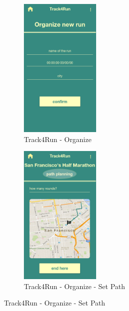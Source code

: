 \begin{figure}[H]
\centering
\begin{subfigure}{.5\textwidth}
\centering
    \includegraphics[width=.9\linewidth, height = 6.8cm, keepaspectratio]{./Images/Mockups/Track4Run/T4R_Organize.png}    
    \caption{Track4Run - Organize}
  \end{subfigure}%
\begin{subfigure}{.5\textwidth}
\centering
    \includegraphics[width=.9\linewidth, height = 6.8cm, keepaspectratio]{./Images/Mockups/Track4Run/T4R_Organize_SetPath.png}
    \caption{Track4Run - Organize - Set Path}
  \end{subfigure}
\end{figure}



